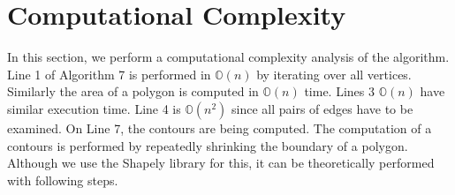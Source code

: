 \documentclass[../main.tex]{subfiles}
\begin{document}
%


\section{Computational Complexity}
\label{section:multi_comp_analysis}

In this section, we perform a computational complexity analysis of the algorithm. Line 1 of Algorithm 7 is performed in $\mathbb{O}(n)$ by iterating over all vertices. Similarly the area of a polygon is computed in $\mathbb{O}(n)$ time. Lines 3 $\mathbb{O}(n)$ have similar execution time. Line 4 is $\mathbb{O}(n^2)$ since all pairs of edges have to be examined. On Line 7, the contours are being computed. The computation of a contours is performed by repeatedly shrinking the boundary of a polygon. Although we use the Shapely library for this, it can be theoretically performed with following steps. 
\end{document}
